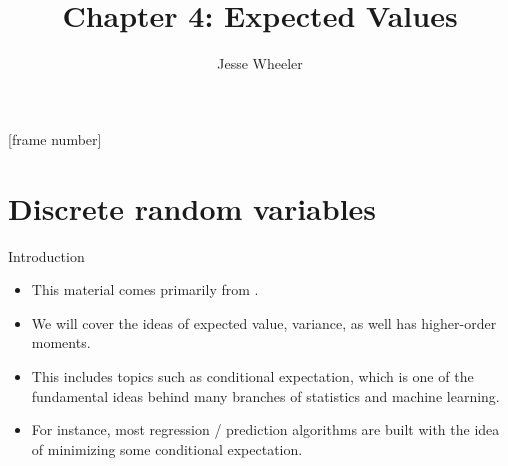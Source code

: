 





\newcommand\CHAPTER{4}
 \newcommand\answer[2]{#1} %

\title{\vspace{2mm} \\ \vspace{2mm}
Chapter \CHAPTER: Expected Values}
\author{Jesse Wheeler}
\date{}

[frame number]






\maketitle



\section{Discrete random variables}

\begin{frame}{Introduction}
  \begin{itemize}
    \item This material comes primarily from \citet[][Chapter~4]{rice07}.
    \item We will cover the ideas of expected value, variance, as well has higher-order moments.
    \item This includes topics such as conditional expectation, which is one of the fundamental ideas behind many branches of statistics and machine learning.
    \item For instance, most regression / prediction algorithms are built with the idea of minimizing some conditional expectation.
  \end{itemize}
\end{frame}

